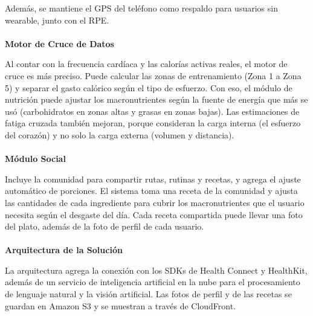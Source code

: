 Además, se mantiene el GPS del teléfono como respaldo para usuarios sin wearable, junto con el RPE.
\\\\
\textbf{Motor de Cruce de Datos}

Al contar con la frecuencia cardíaca y las calorías activas reales, el motor de cruce es más preciso. Puede calcular las zonas de entrenamiento (Zona 1 a Zona 5) y separar el gasto calórico según el tipo de esfuerzo. Con eso, el módulo de nutrición puede ajustar los macronutrientes según la fuente de energía que más se usó (carbohidratos en zonas altas y grasas en zonas bajas). Las estimaciones de fatiga cruzada también mejoran, porque consideran la carga interna (el esfuerzo del corazón) y no solo la carga externa (volumen y distancia).
\\\\
\textbf{Módulo Social}

Incluye la comunidad para compartir rutas, rutinas y recetas, y agrega el ajuste automático de porciones. El sistema toma una receta de la comunidad y ajusta las cantidades de cada ingrediente para cubrir los macronutrientes que el usuario necesita según el desgaste del día. Cada receta compartida puede llevar una foto del plato, además de la foto de perfil de cada usuario.
\\\\
\textbf{Arquitectura de la Solución}

La arquitectura agrega la conexión con los SDKs de Health Connect y HealthKit, además de un servicio de inteligencia artificial en la nube para el procesamiento de lenguaje natural y la visión artificial. Las fotos de perfil y de las recetas se guardan en Amazon S3 y se muestran a través de CloudFront.

